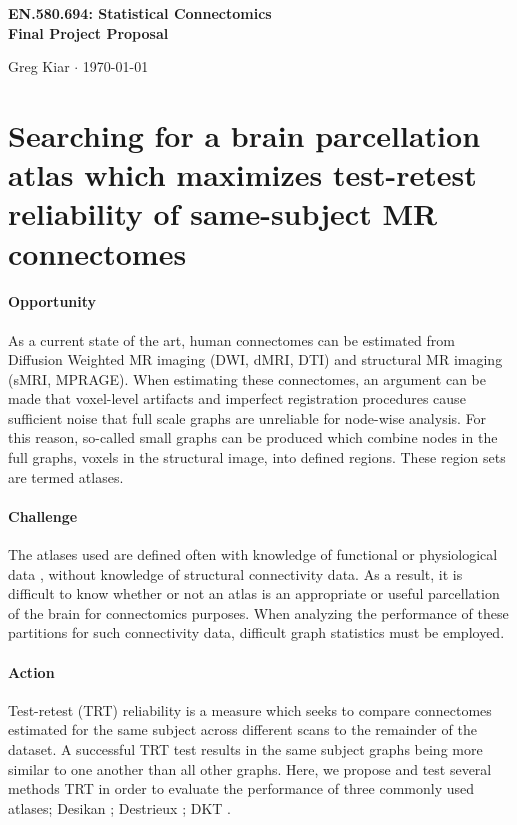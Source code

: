 \documentclass[12pt]{article}
\newcommand{\todo}[1]{{\color{red}{\it TODO: #1}}}
\begin{document}
\begin{center}\Large \bf EN.580.694: Statistical Connectomics \\ Final Project Proposal \end{center}
\begin{center} Greg Kiar $\cdot$  \today \end{center}
\bigskip

\section*{Searching for a brain parcellation atlas which maximizes test-retest reliability of same-subject MR connectomes}

\paragraph{Opportunity}
As a current state of the art, human connectomes can be estimated from Diffusion Weighted MR imaging (DWI, dMRI, DTI) and structural MR imaging (sMRI, MPRAGE). When estimating these connectomes, an argument can be made that voxel-level artifacts and imperfect registration procedures cause sufficient noise that full scale graphs are unreliable for node-wise analysis.  For this reason, so-called small graphs can be produced which combine nodes in the full graphs, voxels in the structural image, into defined regions. These region sets are termed atlases.
\paragraph{Challenge}
The atlases used are defined often with knowledge of functional or physiological data \todo{cite}, without knowledge of structural connectivity data. As a result, it is difficult to know whether or not an atlas is an appropriate or useful parcellation of the brain for connectomics purposes. When analyzing the performance of these partitions for such connectivity data, difficult graph statistics must be employed.
\paragraph{Action}
Test-retest (TRT) reliability is a measure which seeks to compare connectomes estimated for the same subject across different scans to the remainder of the dataset. A successful TRT test results in the same subject graphs being more similar to one another than all other graphs. Here, we propose and test several methods TRT in order to evaluate the performance of three commonly used atlases; Desikan \todo{cite}; Destrieux \todo{cite}; DKT \todo{cite}.
\end{document}
